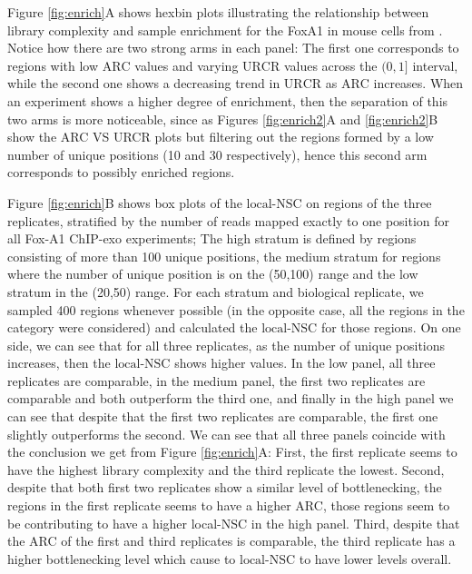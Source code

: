 \documentclass[11pt]{article}\usepackage[]{graphicx}\usepackage[]{color}
\begin{document}
Figure \ref{fig:enrich}A shows hexbin plots illustrating the
relationship between library complexity and sample enrichment for the
FoxA1 in mouse cells from \cite{exoillumina}. Notice how there are two
strong arms in each panel: The first one corresponds to regions with
low $\mbox{ARC}$ values and varying $\mbox{URCR}$ values across the
$(0,1]$ interval, while the second one shows a decreasing trend in
$\mbox{URCR}$ as $\mbox{ARC}$ increases. When an experiment shows a
higher degree of enrichment, then the separation of this two arms is
more noticeable, since as Figures \ref{fig:enrich2}A and
\ref{fig:enrich2}B show the ARC VS URCR plots but filtering out the
regions formed by a low number of unique positions (10 and 30
respectively), hence this second arm corresponds to possibly enriched
regions.



Figure \ref{fig:enrich}B shows box plots of the $\mbox{local-NSC}$ on
regions of the three replicates, stratified by the number of reads
mapped exactly to one position for all Fox-A1 ChIP-exo experiments;
The high stratum is defined by regions consisting of more than
100 unique positions, the medium stratum for regions where
the number of unique position is on the (50,100)
range and the low stratum in the (20,50) range. For
each stratum and biological replicate, we sampled 400
regions whenever possible (in the opposite case, all the regions in
the category were considered) and calculated the $\mbox{local-NSC}$
for those regions. On one side, we can see that for all three
replicates, as the number of unique positions increases, then the
$\mbox{local-NSC}$ shows higher values. In the low panel, all three
replicates are comparable, in the medium panel, the first two
replicates are comparable and both outperform the third one, and
finally in the high panel we can see that despite that the first two
replicates are comparable, the first one slightly outperforms the
second. We can see that all three panels coincide with the conclusion
we get from Figure \ref{fig:enrich}A: First, the first replicate seems
to have the highest library complexity and the third replicate the
lowest. Second, despite that both first two replicates show a similar
level of bottlenecking, the regions in the first replicate seems to
have a higher ARC, those regions seem to be contributing to have a
higher local-NSC in the high panel. Third, despite that the ARC of the
first and third replicates is comparable, the third replicate has a
higher bottlenecking level which cause to $\mbox{local-NSC}$ to have
lower levels overall.
\end{document}
